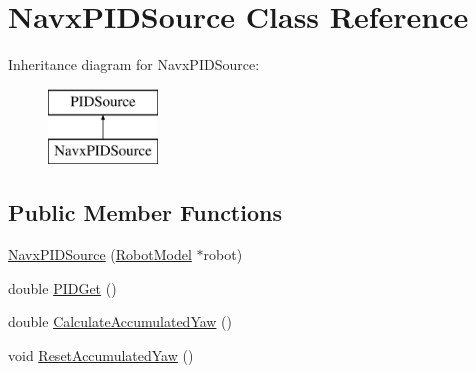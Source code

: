 \hypertarget{class_navx_p_i_d_source}{}\section{Navx\+P\+I\+D\+Source Class Reference}
\label{class_navx_p_i_d_source}
Inheritance diagram for Navx\+P\+I\+D\+Source\+:\begin{figure}[H]
\begin{center}
\leavevmode
\includegraphics[height=2.000000cm]{class_navx_p_i_d_source}
\end{center}
\end{figure}
\subsection*{Public Member Functions}
\begin{DoxyCompactItemize}
\item 
\hyperlink{class_navx_p_i_d_source_a6d8910e49ac582970632e8ad20e9bc4b}{Navx\+P\+I\+D\+Source} (\hyperlink{class_robot_model}{Robot\+Model} $\ast$robot)
\item 
double \hyperlink{class_navx_p_i_d_source_af3d4863c8b9338340739bf0d85371827}{P\+I\+D\+Get} ()
\item 
double \hyperlink{class_navx_p_i_d_source_ac9a334ad2d3d561f4b7e0d4686a1e3c3}{Calculate\+Accumulated\+Yaw} ()
\item 
void \hyperlink{class_navx_p_i_d_source_a553daca7b260429b4808791ff11ada54}{Reset\+Accumulated\+Yaw} ()
\end{DoxyCompactItemize}
